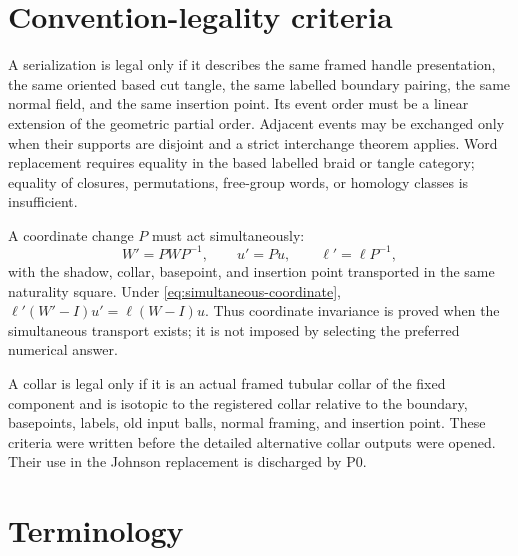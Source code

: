 \section{Convention-legality criteria}\label{app:legality}

A serialization is legal only if it describes the same framed handle
presentation, the same oriented based cut tangle, the same labelled boundary
pairing, the same normal field, and the same insertion point.  Its event order
must be a linear extension of the geometric partial order.  Adjacent events
may be exchanged only when their supports are disjoint and a strict
interchange theorem applies.  Word replacement requires equality in the
based labelled braid or tangle category; equality of closures, permutations,
free-group words, or homology classes is insufficient.

A coordinate change $P$ must act simultaneously:
\begin{equation}\label{eq:simultaneous-coordinate}
W'=PWP^{-1},\qquad u'=Pu,\qquad
\ell'=\ell P^{-1},
\end{equation}
with the shadow, collar, basepoint, and insertion point transported in the
same naturality square.  Under \eqref{eq:simultaneous-coordinate},
$\ell'(W'-I)u'=\ell(W-I)u$.  Thus coordinate invariance is proved when the
simultaneous transport exists; it is not imposed by selecting the preferred
numerical answer.

A collar is legal only if it is an actual framed tubular collar of the fixed
component and is isotopic to the registered collar relative to the boundary,
basepoints, labels, old input balls, normal framing, and insertion point.
These criteria were written before the detailed alternative collar outputs
were opened.  Their use in the Johnson replacement is discharged by P0.

\section{Terminology}\label{app:glossary}

